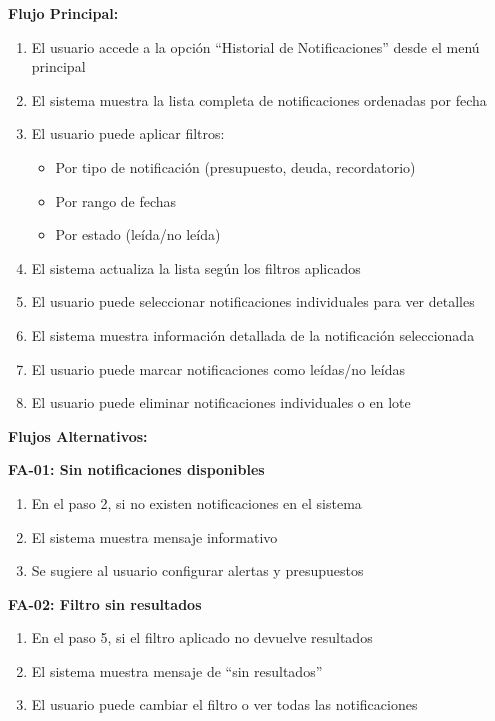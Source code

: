 \noindent\textbf{Flujo Principal:}
\begin{enumerate}
    \item El usuario accede a la opción ``Historial de Notificaciones'' desde el menú principal
    \item El sistema muestra la lista completa de notificaciones ordenadas por fecha
    \item El usuario puede aplicar filtros:
    \begin{itemize}
        \item Por tipo de notificación (presupuesto, deuda, recordatorio)
        \item Por rango de fechas
        \item Por estado (leída/no leída)
    \end{itemize}
    \item El sistema actualiza la lista según los filtros aplicados
    \item El usuario puede seleccionar notificaciones individuales para ver detalles
    \item El sistema muestra información detallada de la notificación seleccionada
    \item El usuario puede marcar notificaciones como leídas/no leídas
    \item El usuario puede eliminar notificaciones individuales o en lote
\end{enumerate}

\noindent\textbf{Flujos Alternativos:}

\textbf{FA-01: Sin notificaciones disponibles}
\begin{enumerate}
    \item En el paso 2, si no existen notificaciones en el sistema
    \item El sistema muestra mensaje informativo
    \item Se sugiere al usuario configurar alertas y presupuestos
\end{enumerate}

\textbf{FA-02: Filtro sin resultados}
\begin{enumerate}
    \item En el paso 5, si el filtro aplicado no devuelve resultados
    \item El sistema muestra mensaje de ``sin resultados''
    \item El usuario puede cambiar el filtro o ver todas las notificaciones
\end{enumerate}

